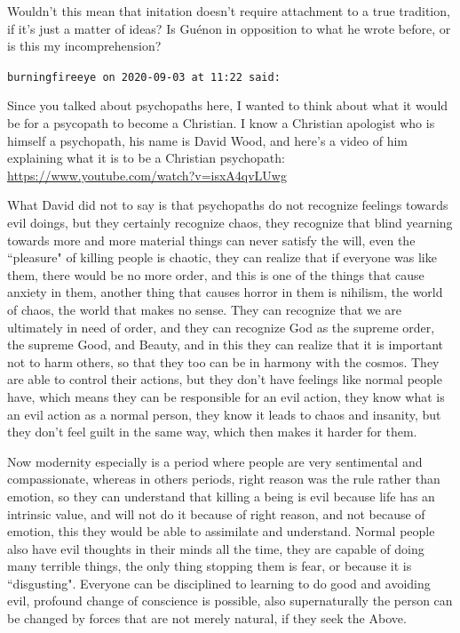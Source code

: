 \begin{footnotesize}
\begin{sffamily}
Wouldn't this mean that initation doesn't require attachment to a true tradition, if it's just a matter of ideas? Is Guénon in opposition to what he wrote before, or is this my incomprehension?


\hfill

\texttt{burningfireeye on 2020-09-03 at 11:22 said: }

Since you talked about psychopaths here, I wanted to think about what it would be for a psycopath to become a Christian.
I know a Christian apologist who is himself a psychopath, his name is David Wood, and here's a
video of him explaining what it is to be a Christian psychopath: \url{https://www.youtube.com/watch?v=isxA4qvLUwg}

What David did not to say is that psychopaths do not recognize feelings towards evil doings, but they certainly recognize chaos, they recognize that blind yearning towards more and more material things can never satisfy the will, even the ``pleasure" of killing people is chaotic, they can realize that if everyone was like them, there would be no more order, and this is one of the things that cause anxiety in them, another thing that causes horror in them is nihilism, the world of chaos, the world that makes no sense. They can recognize that we are ultimately in need of order, and they can recognize God as the supreme order, the supreme Good, and Beauty, and in this they can realize that it is important not to harm others, so that they too can be in harmony with the cosmos. They are able to control their actions, but they don't have feelings like normal people have, which means they can be responsible for an evil action, they know what is an evil action as a normal person, they know it leads to chaos and insanity, but they don't feel guilt in the same way, which then makes it harder for them. 

Now modernity especially is a period where people are very sentimental and compassionate, whereas in others periods, right reason was the rule rather than emotion, so they can understand that killing a being is evil because life has an intrinsic value, and will not do it because of right reason, and not because of emotion, this they would be able to assimilate and understand. Normal people also have evil thoughts in their minds all the time, they are capable of doing many terrible things, the only thing stopping them is fear, or because it is ``disgusting". Everyone can be disciplined to learning to do good and avoiding evil, profound change of conscience is possible, also supernaturally the person can be changed by forces that are not merely natural, if they seek the Above.



\end{sffamily}
\end{footnotesize}
